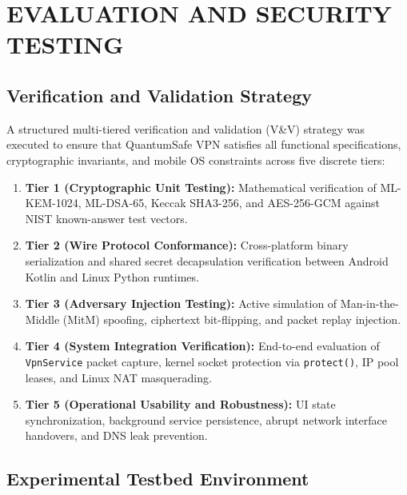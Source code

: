 
\chapter{EVALUATION AND SECURITY TESTING}
\label{chap:testing}
\label{chap:results}

\section{Verification and Validation Strategy}
\label{sec:testing_strategy}

A structured multi-tiered verification and validation (V\&V) strategy was executed to ensure that QuantumSafe VPN satisfies all functional specifications, cryptographic invariants, and mobile OS constraints across five discrete tiers:
\begin{enumerate}
    \item \textbf{Tier 1 (Cryptographic Unit Testing):} Mathematical verification of ML-KEM-1024, ML-DSA-65, Keccak SHA3-256, and AES-256-GCM against NIST known-answer test vectors.
    \item \textbf{Tier 2 (Wire Protocol Conformance):} Cross-platform binary serialization and shared secret decapsulation verification between Android Kotlin and Linux Python runtimes.
    \item \textbf{Tier 3 (Adversary Injection Testing):} Active simulation of Man-in-the-Middle (MitM) spoofing, ciphertext bit-flipping, and packet replay injection.
    \item \textbf{Tier 4 (System Integration Verification):} End-to-end evaluation of \texttt{VpnService} packet capture, kernel socket protection via \texttt{protect()}, IP pool leases, and Linux NAT masquerading.
    \item \textbf{Tier 5 (Operational Usability and Robustness):} UI state synchronization, background service persistence, abrupt network interface handovers, and DNS leak prevention.
\end{enumerate}

\section{Experimental Testbed Environment}
\label{sec:testbed_environment}

